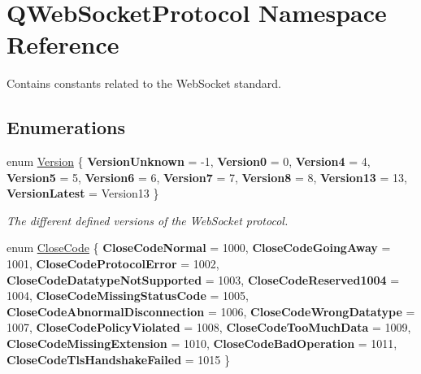 \hypertarget{namespace_q_web_socket_protocol}{}\section{Q\+Web\+Socket\+Protocol Namespace Reference}
\label{namespace_q_web_socket_protocol}


Contains constants related to the Web\+Socket standard.  


\subsection*{Enumerations}
\begin{DoxyCompactItemize}
\item 
enum \mbox{\hyperlink{namespace_q_web_socket_protocol_ad53f2684577effe0a517eadb48714df3}{Version}} \{ \newline
{\bfseries Version\+Unknown} = -\/1, 
{\bfseries Version0} = 0, 
{\bfseries Version4} = 4, 
{\bfseries Version5} = 5, 
\newline
{\bfseries Version6} = 6, 
{\bfseries Version7} = 7, 
{\bfseries Version8} = 8, 
{\bfseries Version13} = 13, 
\newline
{\bfseries Version\+Latest} = Version13
 \}
\begin{DoxyCompactList}\small\item\em The different defined versions of the Web\+Socket protocol. \end{DoxyCompactList}\item 
enum \mbox{\hyperlink{namespace_q_web_socket_protocol_a9f236676f594451d8d723f260b71028c}{Close\+Code}} \{ \newline
{\bfseries Close\+Code\+Normal} = 1000, 
{\bfseries Close\+Code\+Going\+Away} = 1001, 
{\bfseries Close\+Code\+Protocol\+Error} = 1002, 
{\bfseries Close\+Code\+Datatype\+Not\+Supported} = 1003, 
\newline
{\bfseries Close\+Code\+Reserved1004} = 1004, 
{\bfseries Close\+Code\+Missing\+Status\+Code} = 1005, 
{\bfseries Close\+Code\+Abnormal\+Disconnection} = 1006, 
{\bfseries Close\+Code\+Wrong\+Datatype} = 1007, 
\newline
{\bfseries Close\+Code\+Policy\+Violated} = 1008, 
{\bfseries Close\+Code\+Too\+Much\+Data} = 1009, 
{\bfseries Close\+Code\+Missing\+Extension} = 1010, 
{\bfseries Close\+Code\+Bad\+Operation} = 1011, 
\newline
{\bfseries Close\+Code\+Tls\+Handshake\+Failed} = 1015
 \}
\item 

\end{DoxyCompactItemize}
